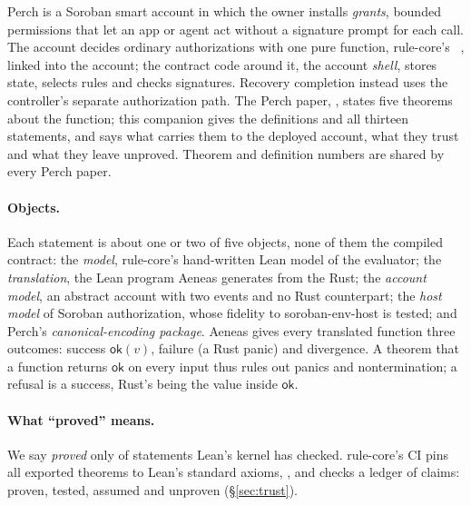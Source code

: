 Perch is a Soroban smart account in which the owner installs \emph{grants},
bounded permissions that let an app or agent act without a signature prompt for
each call. The account decides ordinary authorizations with one pure function,
rule-core's \allowbreak{}~\cite{rule-core},
linked into the account; the contract code around it, the account \emph{shell},
stores state, selects rules and checks signatures. Recovery completion instead
uses the controller's separate authorization path. The Perch paper,
, states five theorems about the function; this companion gives
the definitions and all thirteen statements, and says what carries them to the
deployed account, what they trust and what they leave unproved. Theorem and
definition numbers are shared by every Perch paper.

\paragraph{Objects.} Each statement is about one or two of five objects, none of
them the compiled contract: the \emph{model}, rule-core's hand-written Lean model
of the evaluator; the \emph{translation}, the Lean program Aeneas generates from
the Rust; the \emph{account model}, an abstract account with two events and no
Rust counterpart; the \emph{host model} of Soroban authorization, whose fidelity
to soroban-env-host is tested; and Perch's \emph{canonical-encoding package}.
Aeneas gives every translated function three outcomes: success
$\mathsf{ok}(v)$, failure (a Rust panic) and divergence. A theorem that a function
returns $\mathsf{ok}$ on every input thus rules out panics and nontermination; a
refusal is a success, Rust's  being the value inside
$\mathsf{ok}$.

\paragraph{What ``proved'' means.} We say \emph{proved} only of statements Lean's
kernel has checked. rule-core's CI pins all  exported
theorems to Lean's standard axioms, , and checks a ledger of
 claims:  proven, 
tested,  assumed and  unproven
(\S\ref{sec:trust}).

